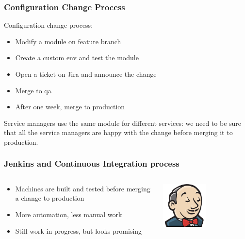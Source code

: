 \documentclass[aspectratio=169]{beamer}
\begin{document}

\begin{frame}
    \frametitle{Configuration Change Process}
    Configuration change process:
    \begin{itemize}
        \item Modify a module on feature branch
        \item Create a custom env and test the module
        \item Open a ticket on Jira and announce the change
        \item Merge to qa
        \item After one week, merge to production
    \end{itemize}

    Service managers use the same module for different services: we need to 
    be sure that all the service managers are happy with the change before 
    merging it to production.
    
\end{frame}


\begin{frame}
    \frametitle{Jenkins and Continuous Integration process}
    \begin{minipage}[T]{0.95\textwidth}
        \begin{columns}
            \begin{column}{0.5\textwidth}
                \begin{itemize}
                    \item Machines are built and tested before merging a 
                        change to production
                    \item More automation, less manual work
                    \item Still work in progress, but looks promising
                \end{itemize}
            \end{column}
            \begin{column}{0.5\textwidth}
                \begin{center}
                    \includegraphics[width=0.5\textwidth]{Jenkins_headshot.png}
                \end{center}
            \end{column}
        \end{columns}
    \end{minipage}
\end{frame}
\end{document}
